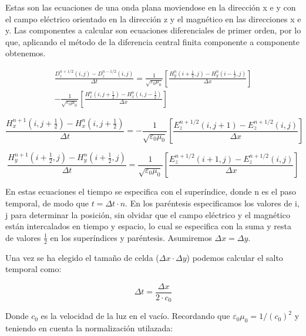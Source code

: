 \documentclass[11pt,a4paper,twoside,pdf]{article}
\numberwithin{equation}{section}
\begin{document}
Estas son las ecuaciones de una onda plana moviendose en la dirección x e y con el campo eléctrico orientado en la dirección z y el magnético en las direcciones x e y. Las componentes a calcular son ecuaciones diferenciales de primer orden, por lo que, aplicando el método de la diferencia central finita componente a componente obtenemos.

\begin{equation}
\begin{split}
\frac{D^{n+1/2}_{z}(i,j)-D^{n-1/2}_{z}(i,j)}{\Delta t}=\frac{1}{\sqrt{\varepsilon_{0}\mu_{0}}}\left[\frac{H^{n}_{y}(i+\frac{1}{2},j)-H^{n}_{y}(i-\frac{1}{2},j)}{\Delta x}\right]  \\
-\frac{1}{\sqrt{\varepsilon_{0}\mu_{0}}}\left[\frac{H^{n}_{x}(i,j+\frac{1}{2})-H^{n}_{x}(i,j-\frac{1}{2})}{\Delta x}\right] 
\end{split}
\end{equation}

\begin{equation}
\frac{H^{n+1}_{x}(i,j+\frac{1}{2})-H^{n}_{x}(i,j+\frac{1}{2})}{\Delta t}=-\frac{1}{\sqrt{\varepsilon_{0}\mu_{0}}}\left[\frac{E^{n+1/2}_{z}(i,j+1)-E^{n+1/2}_{z}(i,j)}{\Delta x}\right] 
\end{equation}

\begin{equation} 
\frac{H^{n+1}_{y}(i+\frac{1}{2},j)-H^{n}_{y}(i+\frac{1}{2},j)}{\Delta t}=\frac{1}{\sqrt{\varepsilon_{0}\mu_{0}}}\left[\frac{E^{n+1/2}_{z}(i+1,j)-E^{n+1/2}_{z}(i,j)}{\Delta x}\right] 
\end{equation}

En estas ecuaciones el tiempo se especifica con el superíndice, donde n es el paso temporal, de modo que $t=\Delta t\cdot n$. En los paréntesis especificamos los valores de i, j para determinar la posición, sin olvidar que el campo eléctrico y el magnético están intercalados en tiempo y espacio, lo cual se especifica con la suma y resta de valores $\frac{1}{2}$ en los superíndices y paréntesis. 
Asumiremos $\Delta x = \Delta y$.

Una vez se ha elegido el tamaño de celda ($\Delta x \cdot \Delta y$) podemos calcular el salto temporal como:

\begin{equation}
\Delta t=\frac{\Delta x}{2 \cdot c_{0}}
\end{equation}

Donde $c_{0}$ es la velocidad de la luz en el vacío. Recordando que $\varepsilon_{0} \mu_{0}=1/(c_{0})^2$ y teniendo en cuenta la normalización utilazada:
\end{document}
